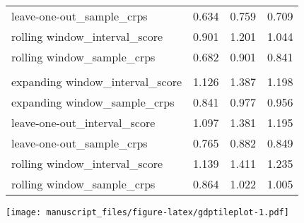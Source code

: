 \documentclass[
]{article}
\begin{document}
\begin{longtable}{l|rrr}
leave-one-out\_sample\_crps & 0.634 & 0.759 & 0.709 \\ 
rolling window\_interval\_score & 0.901 & 1.201 & 1.044 \\ 
rolling window\_sample\_crps & 0.682 & 0.901 & 0.841 \\ 
\midrule\addlinespace[2.5pt]
\multicolumn{4}{l}{horizon = 1.5} \\ 
\midrule\addlinespace[2.5pt]
expanding window\_interval\_score & 1.126 & 1.387 & 1.198 \\ 
expanding window\_sample\_crps & 0.841 & 0.977 & 0.956 \\ 
leave-one-out\_interval\_score & 1.097 & 1.381 & 1.195 \\ 
leave-one-out\_sample\_crps & 0.765 & 0.882 & 0.849 \\ 
rolling window\_interval\_score & 1.139 & 1.411 & 1.235 \\ 
rolling window\_sample\_crps & 0.864 & 1.022 & 1.005 \\ 
\bottomrule
\end{longtable}

\texttt{[image: manuscript\_files/figure-latex/gdptileplot-1.pdf]}
\end{document}
